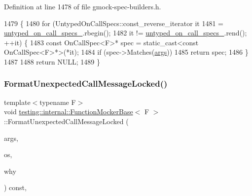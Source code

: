 Definition at line 1478 of file gmock-\/spec-\/builders.\+h.


\begin{DoxyCode}
1479                                        \{
1480     \textcolor{keywordflow}{for} (UntypedOnCallSpecs::const\_reverse\_iterator it
1481              = \hyperlink{classtesting_1_1internal_1_1UntypedFunctionMockerBase_aed2a1913f6c03fd47c8900039556be34}{untyped\_on\_call\_specs\_}.rbegin();
1482          it != \hyperlink{classtesting_1_1internal_1_1UntypedFunctionMockerBase_aed2a1913f6c03fd47c8900039556be34}{untyped\_on\_call\_specs\_}.rend(); ++it) \{
1483       \textcolor{keyword}{const} OnCallSpec<F>* spec = \textcolor{keyword}{static\_cast<}\textcolor{keyword}{const }OnCallSpec<F>*\textcolor{keyword}{>}(*it);
1484       \textcolor{keywordflow}{if} (spec->Matches(\hyperlink{namespacegenerate__debs_a75f9143e38df82d83b2e8a6f99cae02c}{args}))
1485         \textcolor{keywordflow}{return} spec;
1486     \}
1487 
1488     \textcolor{keywordflow}{return} NULL;
1489   \}
\end{DoxyCode}
\mbox{\label{classtesting_1_1internal_1_1FunctionMockerBase_acfddf27974b9fe7cbe90c7e86cce4dcb}} 
\subsubsection{\texorpdfstring{Format\+Unexpected\+Call\+Message\+Locked()}{FormatUnexpectedCallMessageLocked()}}
{\footnotesize\ttfamily template$<$typename F$>$ \\
void \hyperlink{classtesting_1_1internal_1_1FunctionMockerBase}{testing\+::internal\+::\+Function\+Mocker\+Base}$<$ F $>$\+::Format\+Unexpected\+Call\+Message\+Locked (\begin{DoxyParamCaption}\item[{const \hyperlink{classtesting_1_1internal_1_1FunctionMockerBase_a336432a07e544af4ffb8103603471ca3}{Argument\+Tuple} \&}]{args,  }\item[{\+::std\+::ostream $\ast$}]{os,  }\item[{\+::std\+::ostream $\ast$}]{why }\end{DoxyParamCaption}) const\hspace{0.3cm}{\ttfamily [inline]}, {\ttfamily [private]}}




